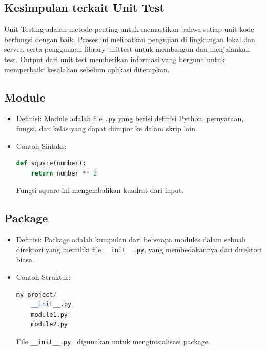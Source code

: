 \documentclass{article}
\begin{document}
\subsection{Kesimpulan terkait Unit Test}
Unit Testing adalah metode penting untuk memastikan bahwa setiap unit kode berfungsi dengan baik. Proses ini melibatkan pengujian di lingkungan lokal dan server, serta penggunaan library unittest untuk membangun dan menjalankan test. Output dari unit test memberikan informasi yang berguna untuk memperbaiki kesalahan sebelum aplikasi diterapkan.

\subsection{Module}
\begin{itemize}
    \item Definisi: Module adalah file \verb|.py| yang berisi definisi Python, pernyataan, fungsi, dan kelas yang dapat diimpor ke dalam skrip lain.
    \item Contoh Sintaks:
          \begin{lstlisting}[language=Python, caption={}, captionpos=b]
    def square(number):
    return number ** 2
\end{lstlisting}
          Fungsi square ini mengembalikan kuadrat dari input.
\end{itemize}

\subsection{Package}
\begin{itemize}
    \item Definisi: Package adalah kumpulan dari beberapa modules dalam sebuah direktori yang memiliki file \verb|__init__.py|, yang membedakannya dari direktori biasa.
    \item Contoh Struktur:
          \begin{lstlisting}[language=Python, caption={}, captionpos=b]
    my_project/
    __init__.py
    module1.py
    module2.py
\end{lstlisting}
          File \verb|__init__.py | digunakan untuk menginisialisasi package.
\end{itemize}
\end{document}
